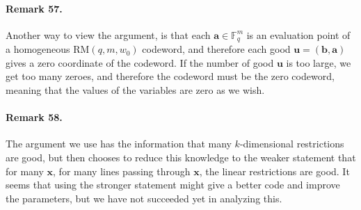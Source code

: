 \paragraph{Remark 57.} Another way to view the argument, is that each $\boldsymbol a\in\mathbb F_q^m$ is an evaluation point of a homogeneous $\mathrm{RM}(q,m,w_0)$ codeword, and therefore each good $\boldsymbol u=(\boldsymbol b,\boldsymbol a)$ gives a zero coordinate of the codeword. If the number of good $\boldsymbol u$ is too large, we get too many zeroes, and therefore the codeword must be the zero codeword, meaning that the values of the variables are zero as we wish.
\paragraph{Remark 58.} The argument we use has the information that many $k$-dimensional restrictions are good, but then chooses to reduce this knowledge to the weaker statement that for many $\boldsymbol x$, for many lines passing through $\boldsymbol x$, the linear restrictions are good. It seems that using the stronger statement might give a better code and improve the parameters, but we have not succeeded yet in analyzing this.
